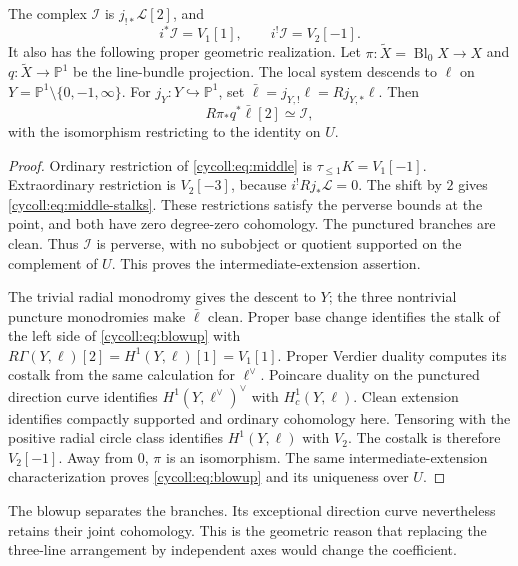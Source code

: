 \begin{theorem}\label{cycoll:thm:middle}
The complex $\mathcal I$ is $j_{!*}\mathcal L[2]$, and
\begin{equation}\label{cycoll:eq:middle-stalks}
 i^*\mathcal I=V_1[1],\qquad i^!\mathcal I=V_2[-1].
\end{equation}
It also has the following proper geometric realization.
Let $\pi:\widetilde X=\operatorname{Bl}_0X\to X$ and
$q:\widetilde X\to\mathbb P^1$ be the line-bundle projection.
The local system descends to $\ell$ on
$Y=\mathbb P^1\setminus\{0,-1,\infty\}$.
For $j_Y:Y\hookrightarrow\mathbb P^1$, set
$\bar\ell=j_{Y,!}\ell=Rj_{Y,*}\ell$. Then
\begin{equation}\label{cycoll:eq:blowup}
 R\pi_*q^*\bar\ell[2]\simeq\mathcal I,
\end{equation}
with the isomorphism restricting to the identity on $U$.
\end{theorem}
\begin{proof}
Ordinary restriction of \eqref{cycoll:eq:middle} is
$\tau_{\leq1}K=V_1[-1]$. Extraordinary restriction is
$V_2[-3]$, because $i^!Rj_*\mathcal L=0$.
The shift by $2$ gives \eqref{cycoll:eq:middle-stalks}.
These restrictions satisfy the perverse bounds at the point,
and both have zero degree-zero cohomology. The punctured
branches are clean. Thus $\mathcal I$ is perverse, with no
subobject or quotient supported on the complement of $U$.
This proves the intermediate-extension assertion.

The trivial radial monodromy gives the descent to $Y$;
the three nontrivial puncture monodromies make $\bar\ell$
clean. Proper base change identifies the stalk of the left
side of \eqref{cycoll:eq:blowup} with
$R\Gamma(Y,\ell)[2]=H^1(Y,\ell)[1]=V_1[1]$.
Proper Verdier duality computes its costalk from the same
calculation for $\ell^\vee$. Poincare duality on the
punctured direction curve identifies
$H^1(Y,\ell^\vee)^\vee$ with $H_c^1(Y,\ell)$.
Clean extension identifies compactly supported and ordinary
cohomology here. Tensoring with the positive radial circle
class identifies $H^1(Y,\ell)$ with $V_2$. The costalk
is therefore $V_2[-1]$. Away from $0$, $\pi$ is an
isomorphism. The same intermediate-extension characterization
proves \eqref{cycoll:eq:blowup} and its uniqueness over $U$.
\end{proof}

The blowup separates the branches. Its exceptional direction
curve nevertheless retains their joint cohomology. This is
the geometric reason that replacing the three-line arrangement
by independent axes would change the coefficient.

